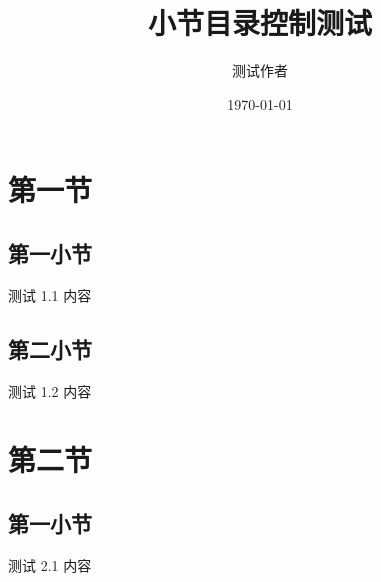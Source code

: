 \documentclass[aspectratio=169, hyperref, UTF8, CJK]{beamer}
\title{小节目录控制测试}
\author{测试作者}
\institute{北京理工大学}
\date{\today}
\begin{document}
\section{第一节}
\subsection{第一小节}
\begin{frame}{测试 1.1}
  内容
\end{frame}

\subsection{第二小节}
\begin{frame}{测试 1.2}
  内容
\end{frame}

\section{第二节}
\subsection{第一小节}
\begin{frame}{测试 2.1}
  内容
\end{frame}
\end{document}

